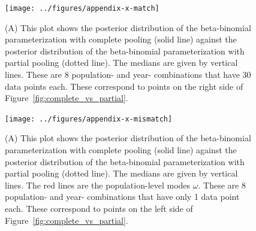 \documentclass[12pt, oneside, titlepage]{article}   	%
\begin{document}
 \begin{figure}[h]
   \centering
       \texttt{[image: ../figures/appendix-x-match]}  
    \caption{ (A) This plot shows the posterior distribution of the beta-binomial parameterization with complete pooling (solid line) against the posterior distribution of the beta-binomial parameterization with partial pooling (dotted line). The medians are given by vertical lines. These are 8 population- and year- combinations that have 30 data points each. These correspond to points on the right side of Figure~\ref{fig:complete_vs_partial}. }
 \label{fig:match}
\end{figure}

 \begin{figure}[h]
   \centering
       \texttt{[image: ../figures/appendix-x-mismatch]}  
    \caption{ (A) This plot shows the posterior distribution of the beta-binomial parameterization with complete pooling (solid line) against the posterior distribution of the beta-binomial parameterization with partial pooling (dotted line). The medians are given by vertical lines. The red lines are the population-level modes $\omega$. These are 8 population- and year- combinations that have only 1 data point each. These correspond to points on the left side of Figure~\ref{fig:complete_vs_partial}. }
 \label{fig:mismatch}
\end{figure}

\clearpage

\end{document}
